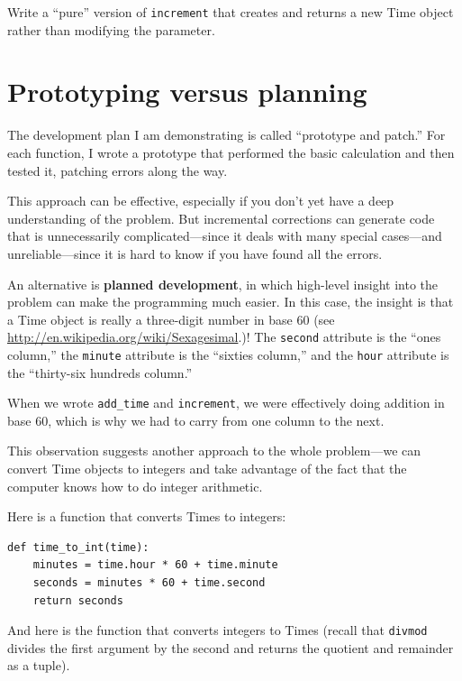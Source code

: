 \documentclass[10pt]{book}
\begin{document}
\begin{exercise}

Write a ``pure'' version of {\tt increment} that creates and returns
a new Time object rather than modifying the parameter.

\end{exercise}


\section{Prototyping versus planning}
\label{prototype}

The development plan I am demonstrating is called ``prototype and
patch.''  For each function, I wrote a prototype that performed the
basic calculation and then tested it, patching errors along the
way.

This approach can be effective, especially if you don't yet have a
deep understanding of the problem.  But incremental corrections can
generate code that is unnecessarily complicated---since it deals with
many special cases---and unreliable---since it is hard to know if you
have found all the errors.

An alternative is {\bf planned development}, in which high-level
insight into the problem can make the programming much easier.  In
this case, the insight is that a Time object is really a three-digit
number in base 60 (see \url{http://en.wikipedia.org/wiki/Sexagesimal}.)!  The
{\tt second} attribute is the ``ones column,'' the {\tt minute}
attribute is the ``sixties column,'' and the {\tt hour} attribute is
the ``thirty-six hundreds column.''

When we wrote \verb"add_time" and {\tt increment}, we were effectively
doing addition in base 60, which is why we had to carry from one
column to the next.

This observation suggests another approach to the whole problem---we
can convert Time objects to integers and take advantage of the fact
that the computer knows how to do integer arithmetic.  

Here is a function that converts Times to integers:

\begin{verbatim}
def time_to_int(time):
    minutes = time.hour * 60 + time.minute
    seconds = minutes * 60 + time.second
    return seconds
\end{verbatim}
%
And here is the function that converts integers to Times
(recall that {\tt divmod} divides the first argument by the second
and returns the quotient and remainder as a tuple).
\end{document}

